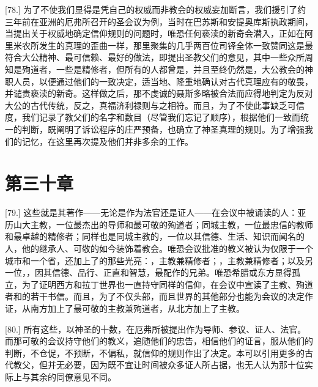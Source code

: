 [78.] 为了不使我们显得是凭自己的权威而非教会的权威妄加断言，我们援引了约三年前在亚洲的厄弗所召开的圣会议为例，当时在巴苏斯和安提奥库斯执政期间，当提出关于权威地确定信仰规则的问题时，唯恐任何亵渎的新奇会潜入，正如在阿里米农所发生的真理的歪曲一样，那里聚集的几乎两百位司铎全体一致赞同这是最符合大公精神、最可信赖、最好的做法，即提出圣教父们的意见，其中一些众所周知是殉道者，一些是精修者，但所有的人都曾是，并且至终仍然是，大公教会的神职人员，以便通过他们的一致决定，适当地、隆重地确认对古代真理应有的敬畏，并谴责亵渎的新奇。这样做之后，那不虔诚的聂斯多略被合法而应得地判定为反对大公的古代传统，反之，真福济利禄则与之相符。而且，为了不使此事缺乏可信度，我们记录了教父们的名字和数目（尽管我们忘记了顺序），根据他们一致而统一的判断，既阐明了诉讼程序的庄严预备，也确立了神圣真理的规则。为了增强我们的记忆，在这里再次提及他们并非多余的工作。\par


\section{第三十章}

\par

[79.] 这些就是其著作——无论是作为法官还是证人——在会议中被诵读的人：亚历山大主教，一位最杰出的导师和最可敬的殉道者；同城主教，一位最忠信的教师和最卓越的精修者；同样也是同城主教的，一位以其信德、生活、知识而闻名的人，他的继承人、可敬的如今装饰着教会。唯恐会议批准的教义被认为仅限于一个城市和一个省，还加上了的那些光亮：，主教兼精修者；，主教兼精修者；以及另一位，，因其信德、品行、正直和智慧，最配作的兄弟。唯恐希腊或东方显得孤立，为了证明西方和拉丁世界也一直持守同样的信仰，在会议中宣读了主教、殉道者和的若干书信。而且，为了不仅头部，而且世界的其他部分也能为会议的决定作证，从南方加上了最可敬的主教兼殉道者，从北方加上了主教。\par

[80.] 所有这些，以神圣的十数，在厄弗所被提出作为导师、参议、证人、法官。而那可敬的会议持守他们的教义，追随他们的忠告，相信他们的证言，服从他们的判断，不仓促，不预断，不偏私，就信仰的规则作出了决定。本可以引用更多的古代教父，但并无必要，因为既不宜让时间被众多证人所占据，也无人认为那十位实际上与其余的同僚意见不同。\par

